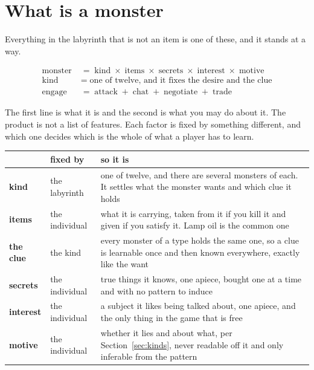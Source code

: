 \documentclass[11pt,a4paper]{article}
\begin{document}
\section{What is a monster}
\label{sec:monster}

Everything in the labyrinth that is not an item is one of these, and it stands at a way.

\begin{center}
\begin{tcolorbox}[plainbg, colback=pale, width=0.9\textwidth]
\begin{align*}
\text{monster} \;&=\; \text{kind} \;\times\; \text{items} \;\times\; \text{secrets} \;\times\;
   \text{interest} \;\times\; \text{motive} \\
\text{kind}    \;&=\; \text{one of twelve, and it fixes the desire and the clue} \\
\text{engage}  \;&=\; \text{attack} \;+\; \text{chat} \;+\; \text{negotiate} \;+\; \text{trade}
\end{align*}
\end{tcolorbox}
\end{center}

The first line is what it is and the second is what you may do about it. The product is not a list
of features. Each factor is fixed by something different, and which one decides which is the whole
of what a player has to learn.

\begin{center}
\begin{tabular}{@{}l@{\hspace{4mm}}l@{\hspace{4mm}}>{\raggedright\arraybackslash}p{}@{}}
\toprule
& \textbf{fixed by} & \textbf{so it is} \\
\midrule
\textbf{kind}     & the labyrinth & one of twelve, and there are several monsters of each. It
settles what the monster wants and which clue it holds \\[1mm]
\textbf{items}    & the individual & what it is carrying, taken from it if you kill it and given if
you satisfy it. Lamp oil is the common one \\[1mm]
\textbf{the clue} & the kind & every monster of a type holds the same one, so a clue is learnable
once and then known everywhere, exactly like the want \\[1mm]
\textbf{secrets}  & the individual & true things it knows, one apiece, bought one at a time and
with no pattern to induce \\[1mm]
\textbf{interest} & the individual & a subject it likes being talked about, one apiece, and the
only thing in the game that is free \\[1mm]
\textbf{motive}   & the individual & whether it lies and about what, per
Section~\ref{sec:kinds}, never readable off it and only inferable from the pattern \\
\bottomrule
\end{tabular}
\end{center}
\end{document}
